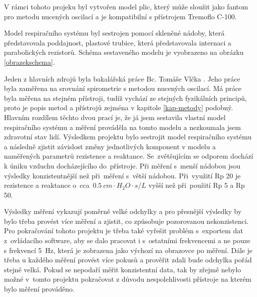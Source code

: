 V rámci tohoto projeku byl vytvořen model plic, který může sloužit jako fantom pro metodu nucených oscilací a je kompatibilní s přístrojem Tremoflo C-100. 

Model respiračního systému byl sestrojen pomocí skleněné nádoby, která představovala poddajnost, plastové trubice, která představovala internaci a parabolických rezistorů.  Schéma sestaveného modelu je vyobrazeno na obrázku \ref{obrazekschema}. 

Jeden z hlavních zdrojů byla bakalářská práce Bc. Tomáše Vlčka \cite{Vlcek2018}. Jeho práce byla zaměřena na srovnání spirometrie s metodou nucených oscilací. Má práce byla měřena na stejném přístroji, tudíž vychází ze stejných fyzikálních principů, proto je popis metod a přístrojů zejména v kapitole \ref{kap-metody} podobný. Hlavním rozdílem těchto dvou prací je, že já jsem sestavila vlastní model respiračního systému a měření prováděla na tomto modelu a nezkoumala jsem zdravotní stav lidí. Výsledkem projektu bylo sestrojit model respiračního systému a následně zjistit závislost změny jednotlivých komponent v modelu a naměřených parametrů rezistence a reaktance. Se~zvětšujícím se odporem dochází k úniku vzduchu docházejícího do~přístroje. Při měření s~menší nádobou jsou výsledky konzistentnější než při~měření s~větší nádobou. Při~využití Rp 20 je rezistence a reaktance o~cca~$\SI{0,5}{cm \cdot H_{2}O \cdot s/L}$ vyšší než při~použití Rp 5 a Rp 50. 

Výsledky měření vykazují poměrně velké odchylky a pro přesnější výsledky by bylo třeba provést více měření a zjistit, co způsobuje pozorovanou nekonzistenci. Pro pokračování tohoto projektu je třeba také vyřešit problém s~exportem dat z~ovládacího software, aby se dalo pracovat i s~ostatními frekvencemi a ne pouze s frekvencí \SI{5}{Hz}, která je zobrazena jako výchozí na obrazovce po měření. Dále je třeba u každého měření provést více pokusů a prověřit zdali bude odchylka pořád stejně velká. 
Pokud se nepodaří měřit konzistentní data, tak by zřejmě nebylo možné v~tomto projektu pokračovat z důvodu nespolehlivosti přístroje na kterém bylo měření prováděno. 
